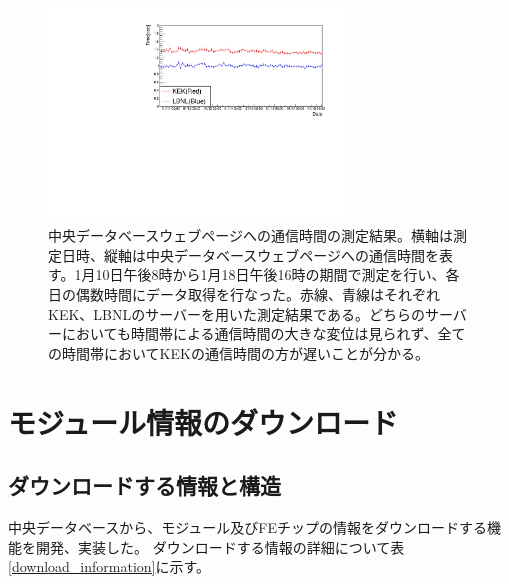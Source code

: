 \begin{figure}[bpt]\centering
  \begin{center}
    \includegraphics[width=8cm,angle=270]{./monitor_accessing_time.pdf}
  \caption[中央データベースウェブページへの通信時間の測定結果]{中央データベースウェブページへの通信時間の測定結果。横軸は測定日時、縦軸は中央データベースウェブページへの通信時間を表す。1月10日午後8時から1月18日午後16時の期間で測定を行い、各日の偶数時間にデータ取得を行なった。赤線、青線はそれぞれKEK、LBNLのサーバーを用いた測定結果である。どちらのサーバーにおいても時間帯による通信時間の大きな変位は見られず、全ての時間帯においてKEKの通信時間の方が遅いことが分かる。}
  \label{monitor_accessing_time}
  \end{center}
\end{figure}



\clearpage
\section{モジュール情報のダウンロード}
\subsection{ダウンロードする情報と構造}
中央データベースから、モジュール及びFEチップの情報をダウンロードする機能を開発、実装した。
ダウンロードする情報の詳細について表\ref{download_information}に示す。

